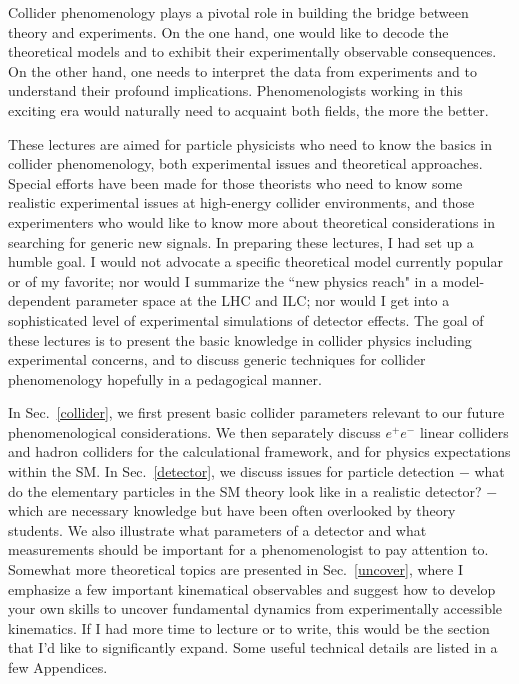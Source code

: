 \documentclass[12pt,prd,aps,floats,preprintnumbers,preprint,superscriptaddress,floatfix,nofootinbib]{revtex4}
\def\epem{e^+e^-}
\begin{document}
Collider phenomenology plays a pivotal role in building the 
bridge between theory and experiments. On the one hand,  one would like
to decode the theoretical models and to exhibit their experimentally 
observable consequences. On the other hand, one needs to interpret 
the data from experiments and to understand their profound implications. 
Phenomenologists working in this exciting era would naturally need to acquaint
both fields, the more the better. 

These lectures are aimed for particle physicists who need to know 
the basics in collider phenomenology, both experimental issues and
theoretical approaches.  Special efforts have been made for 
those theorists  who need to know some  realistic experimental issues
at high-energy collider environments,  and those experimenters 
who would like to know more about theoretical considerations 
in searching for generic new signals. In preparing these lectures, 
I had set up a humble goal. I would not advocate
a specific theoretical model currently popular or of my favorite; nor  would I
summarize the ``new physics reach"  in a model-dependent parameter space
at the LHC and ILC; nor would I get into a sophisticated level of experimental
simulations of detector effects.  
The goal of these lectures is to present the basic knowledge 
in collider physics including experimental concerns, 
and to discuss generic techniques for collider 
phenomenology  hopefully in a pedagogical manner. 

In Sec.~\ref{collider}, we first present basic collider parameters relevant to
our future phenomenological considerations. We then separately discuss 
$\epem$ linear colliders and hadron colliders for the calculational framework,
and for physics expectations within the SM. 
In Sec.~\ref{detector}, we discuss issues for particle detection  $-$
what do the elementary particles in the SM theory look like in a realistic
detector? $-$ which
are necessary knowledge but have been often overlooked by theory students. 
We also illustrate  what parameters of a detector and what measurements
should be important for a phenomenologist to pay attention to.  
Somewhat more theoretical topics are presented in Sec.~\ref{uncover}, 
where I emphasize a few important kinematical observables and suggest 
how to develop your own skills to uncover fundamental
dynamics from experimentally accessible kinematics. If I had more time
to lecture or to write,
this would be the section that I'd like to significantly expand. 
Some useful technical details are listed in a few Appendices. 
\end{document}
